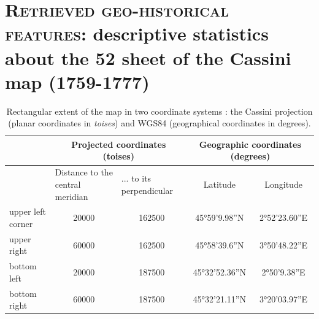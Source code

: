 \documentclass[portrait,a0]{sciposter}
\begin{document}
\vspace{-1cm}
\begin{minipage}[b]{\textwidth}
  \section{\normalfont \textsc{Retrieved geo-historical features}: descriptive statistics about the 52 sheet of the Cassini map (1759-1777)}
  \begin{multicols}{3}
    \setlength{\columnsep}{80pt}
    \footnotesize
    \begin{table}[]
      \begin{center}
        \captionsetup{type=table}
        \caption{Rectangular extent of the map in two coordinate systems : the Cassini projection (planar coordinates in \emph{toises}) and WGS84 (geographical coordinates in degrees).}
        \label{table:translation}
        \begin{tabular}{@{}lcccc@{}}
          \toprule
          & \multicolumn{2}{c}{Projected coordinates (toises)}                                                & \multicolumn{2}{c}{Geographic coordinates (degrees)}              \\
          \midrule
          & \multicolumn{1}{l}{Distance to the central meridian} & \multicolumn{1}{l}{... to its perpendicular} & \multicolumn{1}{c}{Latitude} & \multicolumn{1}{c}{Longitude} \\
          upper left corner & \num{20000}                                          & \num{162500}                                 & 45°59'9.98''N                & 2°52'23.60''E                 \\
          upper right       & \num{60000}                                          & \num{162500}                                 & 45°58'39.6''N                & 3°50'48.22''E                 \\
          bottom left      & \num{20000}                                        & \num{187500}                                & 45°32'52.36''N               & 2°50'9.38''E                  \\
          bottom right     & \num{60000}                                          & \num{187500}                                & 45°32'21.11''N               & 3°20'03.97''E                 \\
          \bottomrule
        \end{tabular}
      \end{center}
    \end{table}
    

\end{multicols}
\end{minipage}
\end{document}
